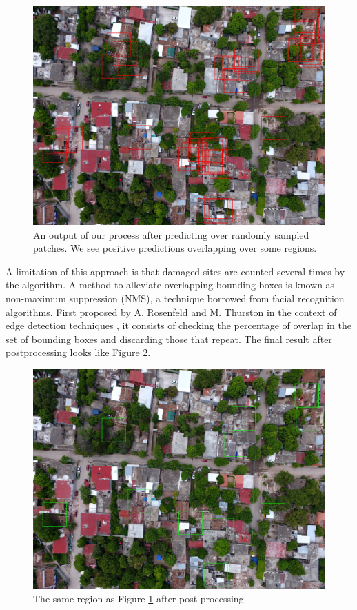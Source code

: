 \begin{figure}[!h]
  \centering
  \includegraphics[width=\textwidth]{images/overlap.jpg}
  \caption{An output of our process after predicting over randomly sampled patches. We see positive predictions overlapping over some regions.}
  \label{fig:overlap}
\end{figure}

A limitation of this approach is that damaged sites are counted several times by the algorithm. A method to alleviate overlapping bounding boxes is known as non-maximum suppression (NMS), a technique borrowed from facial recognition algorithms. First proposed by A. Rosenfeld and M. Thurston in the context of edge detection techniques \cite{1671883}, it consists of checking the percentage of overlap in the set of bounding boxes and discarding those that repeat. The final result after postprocessing looks like Figure \ref{fig:nooverlap}.\\


\begin{figure}[!h]
  \centering
  \includegraphics[width=\textwidth]{images/no-overlap.jpg}
  \caption{The same region as Figure \ref{fig:overlap} after post-processing.}
  \label{fig:nooverlap}
\end{figure}


